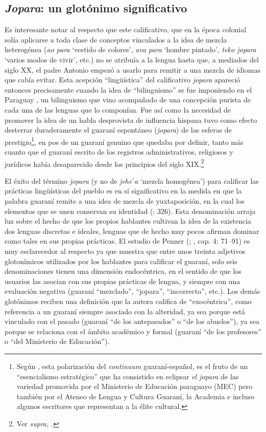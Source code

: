 \documentclass[output=paper]{langscibook}
\begin{document}
\subsection{\textit{Jopara}: un glotónimo significativo}


Es interesante notar al respecto que este calificativo, que en la época colonial solía aplicarse a toda clase de conceptos vinculados a la idea de mezcla heterogénea (\textit{ao para} ‘vestido de colores’, \textit{ava para} ‘hombre pintado’, \textit{teko jopara} ‘varios modos de vivir’, etc.) no se atribuía a la lengua hasta que, a mediados del siglo XX, el padre Antonio \citet{Guasch1948} empezó a usarlo para remitir a una mezcla de idiomas que cabía evitar. Esta acepción “lingüística” del calificativo \textit{jopara} apareció entonces precisamente cuando la idea de “bilinguismo” se fue imponiendo en el Paraguay \citep{Penner2014}, un bilinguismo que vino acompañado de una concepción purista de cada una de las lenguas que lo componían. Fue así como la necesidad de promover la idea de un habla desprovista de influencia hispana tuvo como efecto desterrar duraderamente el guaraní espontáneo (\textit{jopara}) de las esferas de prestigio\footnote{Según \citet{Stewart2017}, esta polarización del \textit{continuum} guaraní-español, es el fruto de un “esencialismo estratégico” que ha consistido en eclipsar \textit{el jopara} de las variedad promovida por el Ministerio de Educación paraguayo (MEC) pero también por el Ateneo de Lengua y Cultura Guaraní, la Academia e incluso algunos escritores que representan a la élite cultural.}, en pos de un guaraní genuino que quedaba por definir, tanto más cuanto que el guaraní escrito de los registros administrativos, religiosos y jurídicos había desaparecido desde los principios del siglo XIX.\footnote{Ver \textit{supra,} .}

El éxito del término \textit{jopara} (y no de \textit{jeheˈa} ‘mezcla homogénea’) para calificar las prácticas lingüísticas del pueblo es en sí significativo en la medida en que la palabra guaraní remite a una idea de mezcla de yuxtaposición, en la cual los elementos que se unen conservan su identidad (\citealt{Boidin2005}: 326). Esta denominación arroja luz sobre el hecho de que los propios hablantes cultivan la idea de la existencia dos lenguas discretas e ideales, lenguas que de hecho muy pocos afirman dominar como tales en sus propias prácticas. El estudio de Penner (\citeyear{Penner2003}; \citeyear{Penner2014}, cap. 4: 71--91) es muy esclarecedor al respecto ya que muestra que entre unos treinta adjetivos glotonímicos utilizados por los hablantes para calificar el guaraní, solo seis denominaciones tienen una dimensión endocéntrica, en el sentido de que los usuarios las asocian con sus propias prácticas de lengua, y siempre con una evaluación negativa (guaraní “mezclado”, “jopara”, “incorrecto”, etc.). Los demás glotónimos reciben una definición que la autora califica de “exocéntrica”, como referencia a un guaraní siempre asociado con la alteridad, ya sea porque está vinculado con el pasado (guaraní “de los antepasados” o “de los abuelos”), ya sea porque se relaciona con el ámbito académico y formal (guaraní “de los profesores” o “del Ministerio de Educación”).
\end{document}
